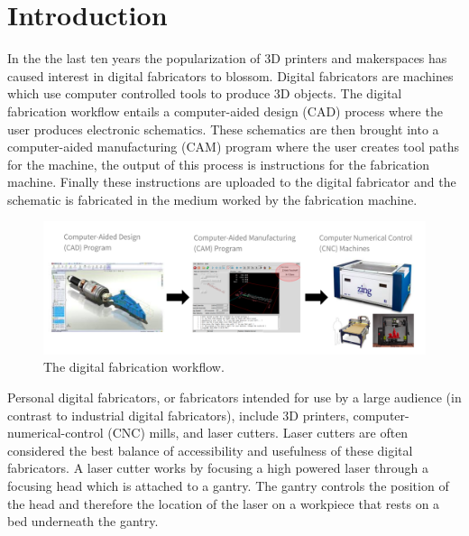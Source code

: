 

\section{Introduction}



In the the last ten years the popularization of 3D printers and makerspaces has caused interest in digital fabricators to blossom. Digital fabricators are machines which use computer controlled tools to produce 3D objects. The digital fabrication workflow entails a computer-aided design (CAD) process where the user produces electronic schematics. These schematics are then brought into a computer-aided manufacturing (CAM) program where the user creates tool paths for the machine, the output of this process is instructions for the fabrication machine. Finally these instructions are uploaded to the digital fabricator and the schematic is fabricated in the medium worked by the fabrication machine. 

\begin{figure}[h]
  \includegraphics[width=\linewidth]{digiFabWorkflow.jpg}
  \caption{The digital fabrication workflow.}
  \label{fig:digiFabWorkflow}
\end{figure}

Personal digital fabricators, or fabricators intended for use by a large audience (in contrast to industrial digital fabricators), include 3D printers, computer-numerical-control (CNC) mills, and laser cutters. Laser cutters are often considered the best balance of accessibility and usefulness of these digital fabricators. A laser cutter works by focusing a high powered laser through a focusing head which is attached to a gantry. The gantry controls the position of the head and therefore the location of the laser on a workpiece that rests on a bed underneath the gantry.

